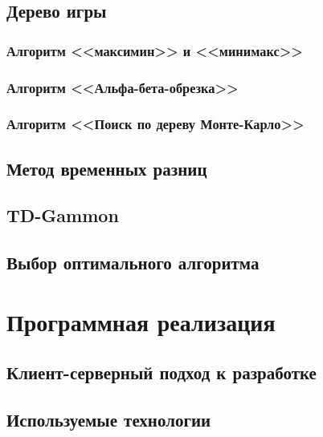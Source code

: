 \documentclass{vsureport}
\begin{document}
\subsection{Дерево игры}


\subsubsection{Алгоритм <<максимин>> и <<минимакс>>}


\subsubsection{Алгоритм <<Альфа-бета-обрезка>>}


\subsubsection{Алгоритм <<Поиск по дереву Монте-Карло>>}


\subsection{Метод временных разниц}


\subsection{TD-Gammon}


\subsection{Выбор оптимального алгоритма}


\section{Программная реализация}


\subsection{Клиент-серверный подход к разработке}


\subsection{Используемые технологии}

\end{document}
